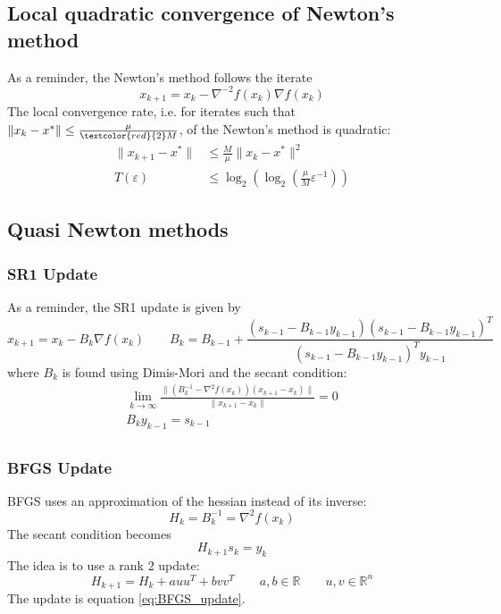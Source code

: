 \documentclass[12pt, openany]{report}
\newcommand{\R}{\mathbb{R}}
\theoremstyle{definition}
\begin{document}
\subsection{Local quadratic convergence of Newton's method}
As a reminder, the Newton's method follows the iterate
\begin{equation}
	x_{k+1} = x_k - \nabla^{-2}f(x_k)\nabla f(x_k)	
\end{equation}
The local convergence rate, i.e. for iterates such that $\|x_k -x^*\| \leq \frac{\mu}{\textcolor{red}{2}M}$, of the Newton's method is quadratic:
\begin{equation}
	\begin{aligned}
		\|x_{k+1}-x^*\| &\leq \frac{M}{\mu}\|x_k-x^*\|^2\\
		T(\varepsilon) &\leq \log_2(\log_2(\frac{\mu}{M} \varepsilon^{-1}))
	\end{aligned}
\end{equation}
\subsection{Quasi Newton methods}
\subsubsection{SR1 Update}
As a reminder, the SR1 update is given by
\begin{equation}
	x_{k+1} = x_k - B_k\nabla f(x_k) \qquad B_k = B_{k-1} + \frac{\left(s_{k-1}-B_{k-1} y_{k-1}\right)\left(s_{k-1}-B_{k-1} y_{k-1}\right)^T}{\left(s_{k-1} - B_{k-1} y_{k-1}\right)^T y_{k-1}}
\end{equation}
where $B_k$ is found using Dimis-Mori and the secant condition:
\begin{equation}
	\begin{aligned}
		\lim_{k\to \infty} \frac{\|\left(B_k^{-1}-\nabla^2f(x_k)\right)(x_{k+1}-x_k)\|}{\|x_{k+1}-x_k\|} = 0\\
		B_k y_{k-1} = s_{k-1}\\
	\end{aligned}
\end{equation}
\subsubsection{BFGS Update}
BFGS uses an approximation of the hessian instead of its inverse:
\begin{equation}
	H_k = B_k^{-1} = \nabla^2 f(x_k)
\end{equation}
The secant condition becomes 
\begin{equation}
	H_{k+1}s_k = y_k
\end{equation}
The idea is to use a rank 2 update:
\begin{equation}
	H_{k+1} = H_k + auu^T + bvv^T \qquad a,b\in \R \qquad u,v\in \R^n 
\end{equation}
The update is equation \eqref{eq:BFGS_update}.
\end{document}

